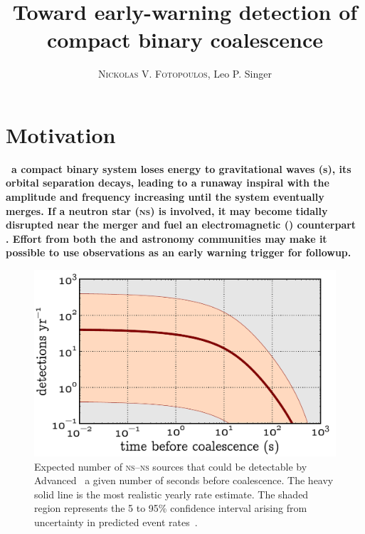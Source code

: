 \documentclass[portrait,plainboxedsections]{sciposter}
\title{Toward early-warning detection of compact binary coalescence}
\author{\textsc{Nickolas V. Fotopoulos}, Leo P. Singer}
\institute{\LIGO{} Laboratory, California Institute of Technology}
\begin{document}

\maketitle

\begin{minipage}[t]{0.25\textwidth}

\section*{Motivation}

\bf{}\rm\ a compact binary system loses energy to gravitational waves (\GW{}s), its
orbital separation decays, leading to a runaway inspiral with the \GW{}
amplitude and frequency increasing until the system eventually merges.  If a
neutron star (\textsc{ns}) is involved, it may become tidally disrupted near
the merger and fuel an electromagnetic (\EM{}) counterpart~%
\cite{shibata:2007}.  Effort from both the \GW{} and astronomy communities may make it
possible to use \GW{} observations as an early warning trigger for \EM{}
followup.
%
\begin{figure}[h]
\includegraphics[width=\textwidth]{figures/snr_in_time}
\caption{\label{fig:earlywarning}Expected number of \textsc{ns}--\textsc{ns}
sources that could be detectable by Advanced \LIGO\ a given number of seconds
before coalescence.  The heavy solid line is the most realistic yearly rate
estimate.  The shaded region represents the 5 to 95\% confidence interval
arising from uncertainty in predicted event rates~\cite{Abadie:2010p10836}.}
\end{figure}

\end{minipage}
\end{document}
